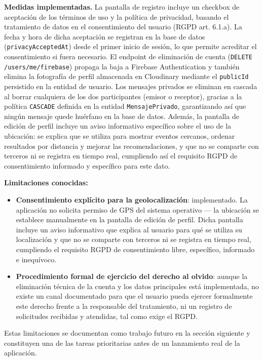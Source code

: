 \textbf{Medidas implementadas.} La pantalla de registro incluye un checkbox de aceptación de los términos de uso y la política de privacidad, basando el tratamiento de datos en el consentimiento del usuario (RGPD art. 6.1.a). La fecha y hora de dicha aceptación se registran en la base de datos (\texttt{privacyAcceptedAt}) desde el primer inicio de sesión, lo que permite acreditar el consentimiento si fuera necesario. El endpoint de eliminación de cuenta (\texttt{DELETE /users/me/firebase}) propaga la baja a Firebase Authentication y también elimina la fotografía de perfil almacenada en Cloudinary mediante el \texttt{publicId} persistido en la entidad de usuario. Los mensajes privados se eliminan en cascada al borrar cualquiera de los dos participantes (emisor o receptor), gracias a la política \texttt{CASCADE} definida en la entidad \texttt{MensajePrivado}, garantizando así que ningún mensaje quede huérfano en la base de datos. Además, la pantalla de edición de perfil incluye un aviso informativo específico sobre el uso de la ubicación: se explica que se utiliza para mostrar eventos cercanos, ordenar resultados por distancia y mejorar las recomendaciones, y que no se comparte con terceros ni se registra en tiempo real, cumpliendo así el requisito RGPD de consentimiento informado y específico para este dato.

\textbf{Limitaciones conocidas:}

\begin{itemize}
    \item \textbf{Consentimiento explícito para la geolocalización}: implementado. La aplicación no solicita permiso de GPS del sistema operativo — la ubicación se establece manualmente en la pantalla de edición de perfil. Dicha pantalla incluye un aviso informativo que explica al usuario para qué se utiliza su localización y que no se comparte con terceros ni se registra en tiempo real, cumpliendo el requisito RGPD de consentimiento libre, específico, informado e inequívoco.

    \item \textbf{Procedimiento formal de ejercicio del derecho al olvido}: aunque la eliminación técnica de la cuenta y los datos principales está implementada, no existe un canal documentado para que el usuario pueda ejercer formalmente este derecho frente a la responsable del tratamiento, ni un registro de solicitudes recibidas y atendidas, tal como exige el RGPD.
\end{itemize}

Estas limitaciones se documentan como trabajo futuro en la sección siguiente y constituyen una de las tareas prioritarias antes de un lanzamiento real de la aplicación.



